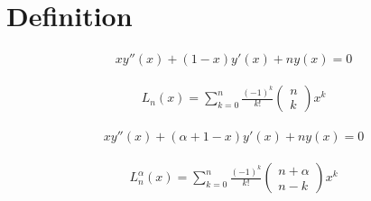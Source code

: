 %
%
%
\section{Definition
\label{laguerre:section:definition}}

\begin{align}
    x y''(x) + (1 - x) y'(x) + n y(x)
    =
    0 
    \label{laguerre:dgl}
\end{align}

\begin{align}
    L_n(x)
    =
    \sum_{k=0}^{n} 
    \frac{(-1)^k}{k!}
    \begin{pmatrix}
        n \\
        k
    \end{pmatrix}
    x^k
    \label{laguerre:polynom}
\end{align}

\begin{align}
    x y''(x) + (\alpha + 1 - x) y'(x) + n y(x)
    =
    0 
    \label{laguerre:generell_dgl}
\end{align}

\begin{align}
    L_n^\alpha (x)
    =
    \sum_{k=0}^{n} 
    \frac{(-1)^k}{k!}
    \begin{pmatrix}
        n + \alpha \\
        n - k
    \end{pmatrix}
    x^k
    \label{laguerre:polynom}
\end{align}
